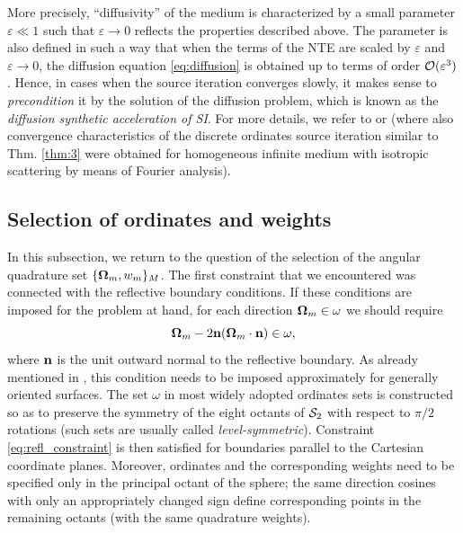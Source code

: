 More precisely, 
``diffusivity'' of the medium is characterized by a small parameter $\varepsilon \ll 1$ such that $\varepsilon\to 0$ 
reflects the properties described above. The parameter is also defined in such a way that when the terms of the NTE are 
scaled by $\varepsilon$ and $\varepsilon \to 0$, the diffusion equation \eqref{eq:diffusion} is obtained up to terms of
order $\mathcal{O}(\varepsilon^3)$. Hence, in cases when the source iteration converges slowly, it makes sense to 
\textit{precondition} it by the solution of the diffusion problem, which is known as the \textit{diffusion synthetic
acceleration of SI}. For more details, we refer to \cite[Chap. 1]{Azmy1} or \cite[Sec. III]{Adams} (where also
convergence characteristics of the discrete ordinates source iteration similar to Thm. \ref{thm:3} were obtained for
homogeneous infinite medium with isotropic scattering by means of Fourier analysis).

\subsection{Selection of ordinates and weights}\label{sec:ordinates}
In this subsection, we return to the question of the selection of the angular quadrature set
$\{\mathbf{\Omega}_m,w_m\}_{M}$.
The first constraint that we encountered was connected with the reflective boundary conditions. If these conditions are
imposed for the problem at hand, for each direction $\mathbf{\Omega}_m\in\omega$ we should require 
\begin{equation}\label{eq:refl_constraint}
	\mathbf{\Omega}_m - 2 \mathbf{n} (\mathbf{\Omega}_m \cdot \mathbf{n}) \in \omega,
\end{equation}
where $\mathbf{n}$ is the unit outward normal to the reflective boundary. As already mentioned in , this
condition needs to be imposed approximately for generally oriented surfaces. The set $\omega$ in most widely adopted
ordinates sets is constructed so as to preserve the symmetry of the eight octants of $\mathcal{S}_2$ with respect to $\pi/2$
rotations (such sets are usually called \textit{level-symmetric}). Constraint \eqref{eq:refl_constraint} is then
satisfied for boundaries parallel to the Cartesian coordinate planes. Moreover, ordinates and the corresponding weights need to be specified only in the principal octant of the
sphere; the same direction cosines with only an appropriately changed sign define corresponding points in the remaining
octants (with the same quadrature weights).

